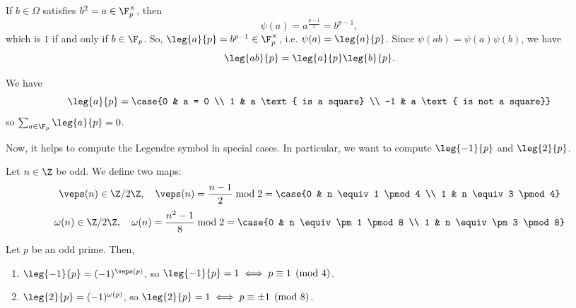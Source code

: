 \begin{prop}
    If $b \in \Omega$ satisfies $b^2 = a \in \F_p^\times$, then
    $$\psi(a) = a^{\frac{p-1}{2}} = b^{p-1},$$
    which is $1$ if and only if $b \in \F_p$. So, $\leg{a}{p} = b^{p-1} \in \F_p^\times$, i.e. $\psi(a) = \leg{a}{p}$. Since $\psi(ab) = \psi(a)\psi(b)$, we have
    $$\leg{ab}{p} = \leg{a}{p} \leg{b}{p}.$$
\end{prop}

\begin{prop}
    We have
    $$\leg{a}{p} = \case{0 & a = 0 \\ 1 & a \text{ is a square} \\ -1 & a \text{ is not a square}}$$
    so $\sum_{a \in \F_p} \leg{a}{p} = 0$.
\end{prop}

Now, it helps to compute the Legendre symbol in special cases. In particular, we want to compute $\leg{-1}{p}$ and $\leg{2}{p}$.

\begin{defn}
    Let $n \in \Z$ be odd. We define two maps:
    $$\veps(n) \in \Z/2\Z, \quad \veps(n) = \frac{n-1}{2} \bmod 2 = \case{0 & n \equiv 1 \pmod 4 \\ 1 & n \equiv 3 \pmod 4}$$
    $$\omega(n) \in \Z/2\Z, \quad \omega(n) = \frac{n^2-1}{8} \bmod 2 = \case{0 & n \equiv \pm 1 \pmod 8 \\ 1 & n \equiv \pm 3 \pmod 8}$$
\end{defn}

\begin{thm}[][label=thm:legendre-special]
    Let $p$ be an odd prime. Then,
    \begin{enumerate}[(1)]
        \item $\leg{-1}{p} = (-1)^{\veps(p)}$, so $\leg{-1}{p} = 1 \iff p \equiv 1 \pmod 4$.
        \item $\leg{2}{p} = (-1)^{\omega(p)}$, so $\leg{2}{p} = 1 \iff p \equiv \pm 1 \pmod 8$.
    \end{enumerate}
\end{thm}

